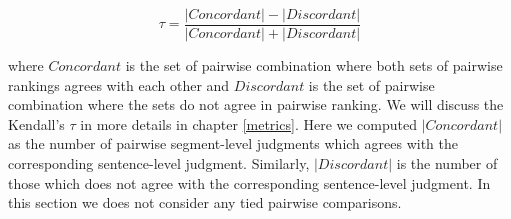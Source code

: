 \begin{equation*}
  \tau = \frac{|Concordant| - |Discordant|}{|Concordant| + |Discordant|}
\end{equation*}

\noindent where $Concordant$ is the set of pairwise combination where both sets
of pairwise rankings agrees with each other and $Discordant$ is the set of
pairwise combination where the sets do not agree in pairwise ranking.
  We will discuss the Kendall's $\tau$ in
more details in chapter \ref{metrics}. Here we computed $|Concordant|$ as the
number of pairwise segment-level judgments which agrees with the corresponding
sentence-level judgment. Similarly, $|Discordant|$ is the number of those which
does not agree with the corresponding sentence-level judgment. In this section
we does not consider any tied pairwise comparisons.

